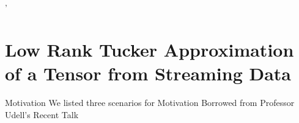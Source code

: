 \documentclass[handout,xcolor={usenames,dvipsnames}]{beamer}
\begin{document}
'

\section{Low Rank Tucker Approximation of a Tensor from Streaming Data}


\begin{frame}{Motivation}
We listed three scenarios for Motivation Borrowed from Professor Udell's Recent Talk
\end{frame}


\newcommand{\stream}{$\T{X}^{(t)} = \T{H}_1 + \cdots + \T{H}_t$}
\newcommand{\all}{$\T{X}^{(T)} = \T{H}_1 + \cdots + \T{H}_T$}
\newcommand{\db}{$\T{X} = \T{H}_1 + \cdots + \T{H}_T$}
\newcommand{\tapx}{$\hat{\T{X}}$}
\newcommand{\skstream}{$\mathcal L(\T{X}^{(t)}) = \mathcal L(\T{H}_1 + \cdots + \T{H}_{t-1}) + \mathcal L(\T{H}_t)$}
\newcommand{\skall}{$= \mathcal L(\T{H}_1 + \cdots + \T{H}_{T-1}) + \mathcal L(\T{H}_T)$}
\newcommand{\skdb}{$\mathcal L(\T{X}) = \mathcal L(\T{H}_1) + \cdots + \mathcal L(\T{H}_T)$}
\newcommand{\skx}{$\mathcal L(\T{X})$}
\newcommand{\skxt}{$\mathcal L(\T{X}^{(T)})$}
\newcommand{\x}{$\T{X}$}
\end{document}
